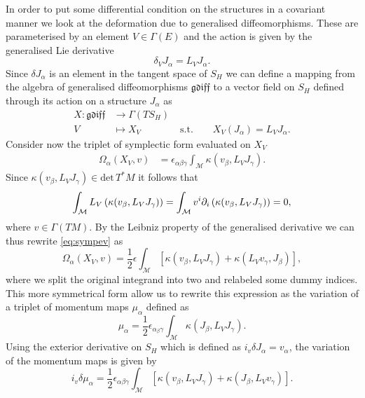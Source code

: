 In order to put some differential condition on the structures in a covariant manner we look at the deformation due to generalised diffeomorphisms. These are parameterised by an element $V\in \Gamma(E)$ and the action is given by the generalised Lie derivative 
\begin{equation}
    \delta_V J_\alpha = L_V J_\alpha. 
\end{equation}
Since $\delta J_\alpha$ is an element in the tangent space of $S_H$ we can define a mapping from the algebra of generalised diffeomorphisms $\mathfrak{gdiff}$ to a vector field on $S_H$ defined through its action on a structure $J_\alpha$ as 
\begin{align}
    X: \mathfrak{gdiff}&\to \Gamma(TS_H)\\
        V&\mapsto X_V \qquad\qquad  \text{s.t.}\qquad X_V(J_\alpha)=L_VJ_\alpha.
\end{align}
Consider now the triplet of symplectic form evaluated on $X_V$
\begin{align}\label{eq:sympev}
    \Omega_\alpha (X_V,v) &= \epsilon_{\alpha\beta\gamma}\int_\mathcal{M}\kappa(v_\beta,L_VJ_\gamma).
\end{align}
Since $\kappa(v_\beta,L_VJ_\gamma) \in \text{det}\, T^{*}M$ it follows that 
\begin{equation}
    \int_\mathcal{M} L_V \left(\kappa(v_\beta,L_VJ_\gamma)\right) = \int_\mathcal{M}v^i\partial_i \left(\kappa(v_\beta,L_VJ_\gamma)\right) = 0,
\end{equation}
where $v\in\Gamma(TM)$. By the Leibniz property of the generalised derivative we can thus rewrite \eqref{eq:sympev} as 
\begin{equation}
    \Omega_\alpha(X_V,v) = \frac{1}{2}\epsilon\int_\mathcal{M}\left[\kappa(v_\beta,L_VJ_\gamma)+\kappa(L_Vv_\gamma,J_\beta)\right],
\end{equation}
where we split the original integrand into two and relabeled some dummy indices. This more symmetrical form allow us to rewrite this expression as the variation of a triplet of momentum maps $\mu_\alpha$ defined as 
\begin{equation}
    \mu_\alpha = \frac{1}{2}\epsilon_{\alpha_\beta\gamma}\int_\mathcal{M}\kappa(J_\beta,L_VJ_\gamma).
\end{equation}
Using the exterior derivative on $S_H$ which is defined as $i_v\delta J_\alpha=v_\alpha$, the variation of the momentum maps is given by 
\begin{equation}
    i_v\delta\mu_\alpha = \frac{1}{2}\epsilon_{\alpha\beta\gamma}\int_{\mathcal{M}}\left[\kappa(v_\beta,L_VJ_\gamma)+\kappa(J_\beta,L_Vv_\gamma)\right].
\end{equation}

